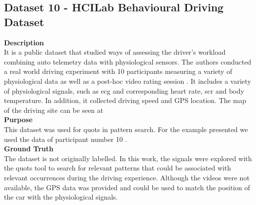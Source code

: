 \subsection{Dataset 10 - HCILab Behavioural Driving Dataset}
\label{dat:dataset11}
\textbf{Description}\hfill\\
It is a public dataset that studied ways of assessing the driver's workload combining auto telemetry data with physiological sensors. The authors conducted a real world driving experiment with 10 participants measuring a variety of physiological data as well as a post-hoc video rating session \cite{hcilab}. It includes a variety of physiological signals, such as \gls{ecg} and corresponding heart rate, \gls{scr} and body temperature. In addition, it collected driving speed and GPS location. The map of the driving site can be seen at \cite{hcilab}\\
\textbf{Purpose}\hfill \\
This dataset was used for \gls{quots} in pattern search. For the example presented we used the data of participant number 10 \cite{hcilab}.\\
\textbf{Ground Truth}\hfill \\
The dataset is not originally labelled. In this work, the signals were explored with the \gls{quots} tool to search for relevant patterns that could be associated with relevant occurrences during the driving experience. Although the videos were not available, the GPS data was provided and could be used to match the position of the car with the physiological signals.

